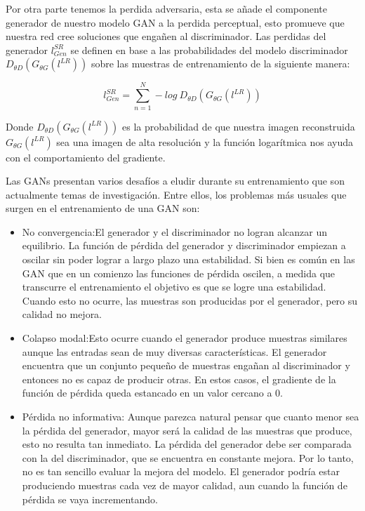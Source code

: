 Por otra parte tenemos la perdida adversaria, esta se añade el componente generador de nuestro modelo GAN a la perdida perceptual,
esto promueve que nuestra red cree soluciones que engañen al discriminador. Las perdidas del generador $l_{Gen}^{SR}$ se definen
en base a las probabilidades del modelo discriminador $D_{\theta D}(G_{\theta G}(l^{LR}))$ sobre las muestras de entrenamiento
de la siguiente manera:

\begin{equation}
  l_{Gen}^{SR}=\sum_{n=1}^{N}-log \ D_{\theta D}(G_{\theta G}(l^{LR}))
\end{equation}


Donde $D_{\theta D}(G_{\theta G}(l^{LR}))$ es la probabilidad de que nuestra imagen reconstruida $G_{\theta G}(l^{LR})$ sea 
una imagen de alta resolución y la función logarítmica nos ayuda con el comportamiento del gradiente. 

Las GANs presentan varios desafíos a eludir durante su entrenamiento
que son actualmente temas de investigación. Entre ellos, los problemas más
usuales que surgen en el entrenamiento de una GAN son:

\begin{itemize}


    \item No convergencia:El generador y el discriminador no logran alcanzar un equilibrio. La
función de pérdida del generador y discriminador empiezan a oscilar sin
poder lograr a largo plazo una estabilidad.
Si bien es común en las GAN que en un comienzo las funciones de pérdida
oscilen, a medida que transcurre el entrenamiento el objetivo es que se
logre una estabilidad. Cuando esto no ocurre, las muestras son producidas
por el generador, pero su calidad no mejora.

\item Colapso modal:Esto ocurre cuando el generador produce muestras similares aunque las
entradas sean de muy diversas características. El generador encuentra que
un conjunto pequeño de muestras engañan al discriminador y entonces
no es capaz de producir otras. En estos casos, el gradiente de la función
de pérdida queda estancado en un valor cercano a 0.

\item Pérdida no informativa: Aunque parezca natural pensar que cuanto menor sea la pérdida del
generador, mayor será la calidad de las muestras que produce, esto no
resulta tan inmediato. La pérdida del generador debe ser comparada con
la del discriminador, que se encuentra en constante mejora. Por lo tanto,
no es tan sencillo evaluar la mejora del modelo. El generador podría estar
produciendo muestras cada vez de mayor calidad, aun cuando la función
de pérdida se vaya incrementando.

\end{itemize}

